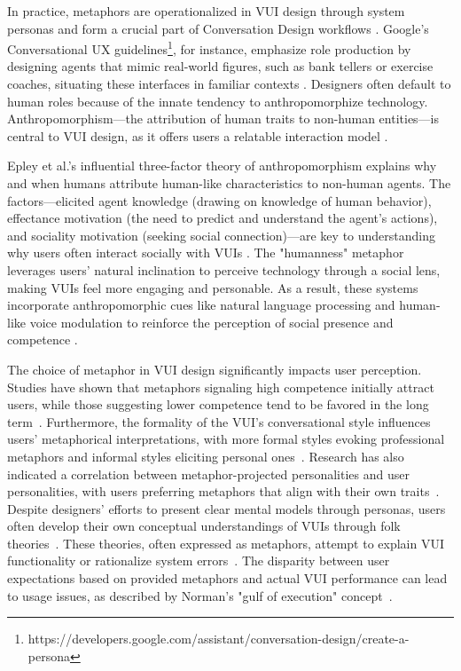 In practice, metaphors are operationalized in VUI design through system personas and form a crucial part of Conversation Design workflows \cite{Sadek_Calvo_Mougenot_2023}. Google's Conversational UX guidelines\footnote{https://developers.google.com/assistant/conversation-design/create-a-persona}, for instance, emphasize role production by designing agents that mimic real-world figures, such as bank tellers or exercise coaches, situating these interfaces in familiar contexts \cite{McMillan_Jaber_2021}. Designers often default to human roles because of the innate tendency to anthropomorphize technology. Anthropomorphism—the attribution of human traits to non-human entities—is central to VUI design, as it offers users a relatable interaction model \cite{Epley_Waytz_Cacioppo_2007}.

Epley et al.'s influential three-factor theory of anthropomorphism explains why and when humans attribute human-like characteristics to non-human agents. The factors—elicited agent knowledge (drawing on knowledge of human behavior), effectance motivation (the need to predict and understand the agent’s actions), and sociality motivation (seeking social connection)—are key to understanding why users often interact socially with VUIs \cite{Epley_Waytz_Cacioppo_2007}. The "humanness" metaphor leverages users' natural inclination to perceive technology through a social lens, making VUIs feel more engaging and personable. As a result, these systems incorporate anthropomorphic cues like natural language processing and human-like voice modulation to reinforce the perception of social presence and competence \cite{Pradhan_Lazar_2021, Purington_Taft_Sannon_Bazarova_Taylor_2017}. 


The choice of metaphor in VUI design significantly impacts user perception. Studies have shown that metaphors signaling high competence initially attract users, while those suggesting lower competence tend to be favored in the long term~\cite{Khadpe_Krishna_Fei-Fei_Hancock_Bernstein_2020}. Furthermore, the formality of the VUI's conversational style influences users' metaphorical interpretations, with more formal styles evoking professional metaphors and informal styles eliciting personal ones~\cite{Chin2024Like}. Research has also indicated a correlation between metaphor-projected personalities and user personalities, with users preferring metaphors that align with their own traits~\cite{Braun_Mainz_Chadowitz_Pfleging_Alt_2019}. Despite designers' efforts to present clear mental models through personas, users often develop their own conceptual understandings of VUIs through folk theories~\cite{DeVito_Birnholtz_Hancock_French_Liu_2018}. These theories, often expressed as metaphors, attempt to explain VUI functionality or rationalize system errors~\cite{Kim_Choudhury_2021, Kuzminykh_Sun_Govindaraju_Avery_Lank_2020, Desai_Twidale_2022}. The disparity between user expectations based on provided metaphors and actual VUI performance can lead to usage issues, as described by Norman's "gulf of execution" concept~\cite{Norman_2013, Luger_Sellen_2016}.


